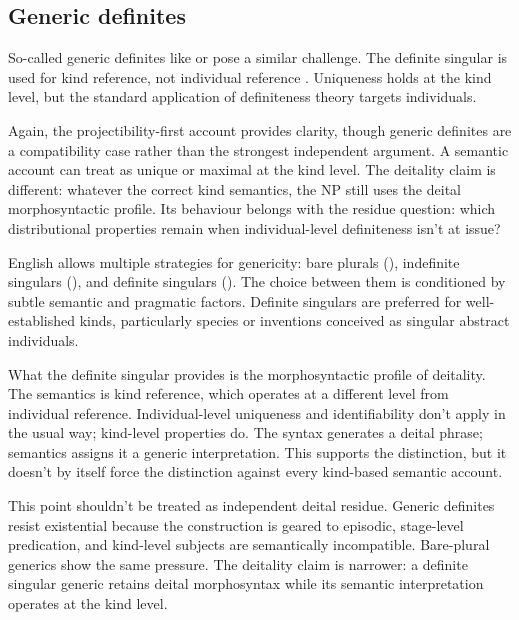 \documentclass[12pt,letterpaper]{article}
\begin{document}
\subsection{Generic definites}

So-called generic definites like  or  pose a similar challenge. The definite singular is used for kind reference, not individual reference \parencite{carlson1977,krifka2004}. Uniqueness holds at the kind level, but the standard application of definiteness theory targets individuals.

Again, the projectibility-first account provides clarity, though generic definites are a compatibility case rather than the strongest independent argument. A semantic account can treat  as unique or maximal at the kind level. The deitality claim is different: whatever the correct kind semantics, the NP still uses the deital morphosyntactic profile. Its behaviour belongs with the residue question: which distributional properties remain when individual-level definiteness isn't at issue?

English allows multiple strategies for genericity: bare plurals (), indefinite singulars (), and definite singulars (). The choice between them is conditioned by subtle semantic and pragmatic factors. Definite singulars are preferred for well-established kinds, particularly species or inventions conceived as singular abstract individuals.

What the definite singular provides is the morphosyntactic profile of deitality. The semantics is kind reference, which operates at a different level from individual reference. Individual-level uniqueness and identifiability don't apply in the usual way; kind-level properties do. The syntax generates a deital phrase; semantics assigns it a generic interpretation. This supports the distinction, but it doesn't by itself force the distinction against every kind-based semantic account.

This point shouldn't be treated as independent deital residue. Generic definites resist existential  because the construction is geared to episodic, stage-level predication, and kind-level subjects are semantically incompatible. Bare-plural generics show the same pressure. The deitality claim is narrower: a definite singular generic retains deital morphosyntax while its semantic interpretation operates at the kind level.
\end{document}
